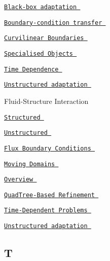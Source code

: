  
\begin{DoxyItemize}
\item  \href{ ../../poisson/fish_poisson/html/index.html#black_box }{\tt Black-\/box adaptation }  
\item  \href{ ../../poisson/fish_poisson/html/index.html#adapt_bc }{\tt Boundary-\/condition transfer }  
\item  \href{ ../../poisson/fish_poisson2/html/index.html }{\tt Curvilinear Boundaries }  
\begin{DoxyItemize}
\item  \href{ ../../the_data_structure/html/index.html#Macro_element_meshes }{\tt Specialised Objects }  
\item  \href{ ../../unsteady_heat/two_d_unsteady_heat_adapt/html/index.html#ellipse }{\tt Time Dependence }  
\item  \href{ ../../navier_stokes/adaptive_bubble_in_channel/html/index.html#adapt }{\tt Unstructured adaptation }  
\end{DoxyItemize}
\item  Fluid-\/\-Structure Interaction   
\begin{DoxyItemize}
\item  \href{ ../../interaction/fsi_collapsible_channel_adapt/html/index.html }{\tt Structured }  
\item  \href{ ../../interaction/unstructured_adaptive_fsi/html/index.html }{\tt Unstructured }  
\end{DoxyItemize} 
\item  \href{ ../../poisson/two_d_poisson_flux_bc_adapt/html/index.html }{\tt Flux Boundary Conditions }  
\item  \href{ ../../unsteady_heat/two_d_unsteady_heat_ALE/html/index.html }{\tt Moving Domains }  
\item  \href{ ../../the_data_structure/html/index.html#mesh_refinement }{\tt Overview }  
\item  \href{ ../../the_data_structure/html/index.html#QuadTreeInMeshes }{\tt Quad\-Tree-\/\-Based Refinement }  
\item  \href{ ../../unsteady_heat/two_d_unsteady_heat_adapt/html/index.html#spatial_adapt }{\tt Time-\/\-Dependent Problems }  
\item  \href{ ../../meshes/mesh_from_inline_triangle/html/index.html }{\tt Unstructured adaptation }  
\end{DoxyItemize}  \subsection*{ T }

